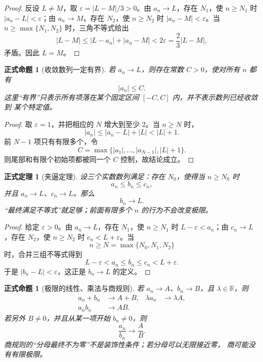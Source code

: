 \documentclass[UTF8,fontset=none,a4paper,11pt]{ctexart}
\theoremstyle{foundation-definition}
\theoremstyle{foundation-theorem}
\newtheorem{theorem}[definition]{正式定理}
\theoremstyle{foundation-proposition}
\newtheorem{proposition}[definition]{正式命题}
\theoremstyle{foundation-example}
\theoremstyle{foundation-remark}
\theoremstyle{foundation-theorem}
\begin{document}
\begin{proof}
反设 \(L\ne M\)，取 \(\varepsilon=|L-M|/3>0\)。由 \(a_n\to L\)，存在
\(N_1\)，使 \(n\ge N_1\) 时 \(|a_n-L|<\varepsilon\)；由 \(a_n\to M\)，存在
\(N_2\)，使 \(n\ge N_2\) 时 \(|a_n-M|<\varepsilon\)。当
\(n\ge\max\{N_1,N_2\}\) 时，三角不等式给出
\[
|L-M|\le |L-a_n|+|a_n-M|<2\varepsilon
=\frac23|L-M|,
\]
矛盾。因此 \(L=M\)。
\end{proof}

\begin{proposition}[收敛数列一定有界]\label{prop:convergent-sequence-bounded}
若 \(a_n\to L\)，则存在常数 \(C>0\)，使对所有 \(n\) 都有
\[
|a_n|\le C.
\]
这里“有界”只表示所有项落在某个固定区间 \([-C,C]\) 内，并不表示数列已经收敛到
某个特定值。
\end{proposition}

\begin{proof}
取 \(\varepsilon=1\)，并把相应的 \(N\) 增大到至少 \(2\)。当 \(n\ge N\) 时，
\[
|a_n|\le |a_n-L|+|L|<|L|+1.
\]
前 \(N-1\) 项只有有限多个，令
\[
C=\max\{|a_1|,\ldots,|a_{N-1}|,|L|+1\}.
\]
则尾部和有限个初始项都被同一个 \(C\) 控制，故结论成立。
\end{proof}

\begin{theorem}[夹逼定理]\label{thm:squeeze-sequence}
设三个实数数列满足：存在 \(N_0\)，使得当 \(n\ge N_0\) 时
\[
a_n\le b_n\le c_n,
\]
并且 \(a_n\to L\)、\(c_n\to L\)。那么
\[
b_n\to L.
\]
“最终满足不等式”就足够；前面有限多个 \(n\) 的行为不会改变极限。
\end{theorem}

\begin{proof}
给定 \(\varepsilon>0\)。由 \(a_n\to L\)，存在 \(N_1\)，使
\(n\ge N_1\) 时 \(L-\varepsilon<a_n\)；由 \(c_n\to L\)，存在 \(N_2\)，使
\(n\ge N_2\) 时 \(c_n<L+\varepsilon\)。当
\[
n\ge N=\max\{N_0,N_1,N_2\}
\]
时，合并三组不等式得到
\[
L-\varepsilon<a_n\le b_n\le c_n<L+\varepsilon.
\]
于是 \(|b_n-L|<\varepsilon\)，这正是 \(b_n\to L\) 的定义。
\end{proof}

\begin{proposition}[极限的线性、乘法与商规则]\label{prop:sequence-limit-algebra}
若 \(a_n\to A\)、\(b_n\to B\)，且 \(\lambda\in\mathbb R\)，则
\[
\begin{aligned}
a_n+b_n&\longrightarrow A+B, &
\lambda a_n&\longrightarrow\lambda A,\\
a_nb_n&\longrightarrow AB.
\end{aligned}
\]
若另外 \(B\ne0\)，并且从某一项开始 \(b_n\ne0\)，则
\[
\frac{a_n}{b_n}\longrightarrow\frac AB.
\]
商规则的“分母最终不为零”不是装饰性条件；若分母可以无限接近零，
商可能没有有限极限。
\end{proposition}
\end{document}
